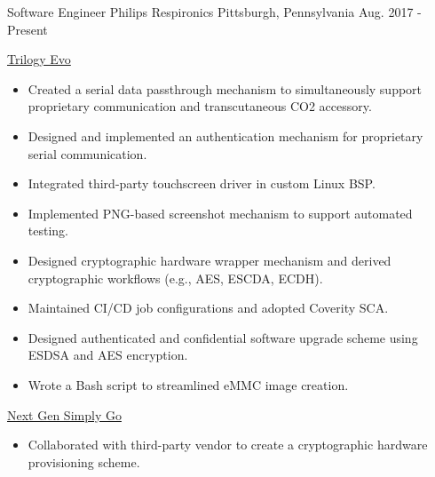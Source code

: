 

\begin{cventries}

\cventry
  {Software Engineer} %
  {Philips Respironics} %
  {Pittsburgh, Pennsylvania} %
  {Aug. 2017 - Present} %
  {
    \begin{cvitems}
    \item
    {
      \href{https://www.usa.philips.com/healthcare/product/HC0055500/trilogy-evo-portable-hospital-to-home-ventilator}{\color{RoyalBlue}Trilogy Evo}
      \begin{itemize}
        \item Created a serial data passthrough mechanism to simultaneously support proprietary communication and transcutaneous CO2 accessory.
        \item Designed and implemented an authentication mechanism for proprietary serial communication.
        \item Integrated third-party touchscreen driver in custom Linux BSP.
        \item Implemented PNG-based screenshot mechanism to support automated testing.
        \item Designed cryptographic hardware wrapper mechanism and derived cryptographic workflows (e.g., AES, ESCDA, ECDH).
        \item Maintained CI/CD job configurations and adopted Coverity SCA.
        \item Designed authenticated and confidential software upgrade scheme using ESDSA and AES encryption.
        \item Wrote a Bash script to streamlined eMMC image creation.
      \end{itemize}
    }
    \item
    {
      \href{https://www.usa.philips.com/healthcare/product/HCNOCTN350/simplygo-mini-portable-oxygen-concentrator-poc}{\color{RoyalBlue}Next Gen Simply Go}
      \begin{itemize}
        \item Collaborated with third-party vendor to create a cryptographic hardware provisioning scheme.

\end{itemize}}
\end{cvitems}}
\end{cventries}
